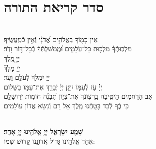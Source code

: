 \documentclass[twoside, openany, parskip=half, 11pt]{book}
\begin{document}
\nextpage

\section[סדר קריאת התורה]{ סדר קריאת התורה }


\\
 אֵין־כָּמ֖וֹךָ בָֽאֱלֹהִ֥ים אֲ֝דֹנָ֗י וְֿאֵ֣ין כְּֿמַֽעֲשֶֽׂיךָ׃
 \\
מַלְכֽוּתְֿךָ֗ מַלְכ֥וּת כׇּל־עֹֽלָמִ֑ים וּ֝מֶֽמְשַׁלְתְּֿךָ֗ בְּֿכׇל־דּ֥וֹר וָדֹֽר׃
 \\
יְיָ֣ ֖מֶֽלֶךְ
 \\
 יְיָ֣ מָלָךְ֘
 \\
 יְיָ֥ יִמְלֹ֖ךְ לְֿעֹלָ֥ם וָעֶֽד׃
 \\
יְיָ֗ עֹ֖ז לְֿעַמּ֣וֹ יִתֵּ֑ן יְיָ֓ יְֿבָרֵ֖ךְ אֶת־עַמּ֣וֹ בַשָּׁלֽוֹם׃
\\
אַב הָרַחֲמִים הֵיטִ֣יבָה בִֽ֭רְצֽוֹנְֿךָ אֶת־צִיּ֑וֹן תִּ֝בְנֶ֗ה חוֹמ֥וֹת יְֿרֽוּשָׁלָֽםִ׃
 \\
כִּי בְֿךָ לְֿבַד בָּטָֽחְֿנוּ מֶֽלֶךְ אֵל רָם וְֿנִשָּׂא אֲדוֹן עוֹלָמִים׃


\\

\textbf{שְׁמַ֖ע יִשְׂרָאֵ֑ל יְיָ֥ אֱלֹהֵ֖ינוּ יְיָ֥ אֶחָֽד׃}\\

אֶחָד אֱלֹהֵֽינוּ גָּדוֹל אֲדוֹנֵֽנוּ קָדוֹשׁ שְֿׁמוֹ:


\pesicha
\end{document}
